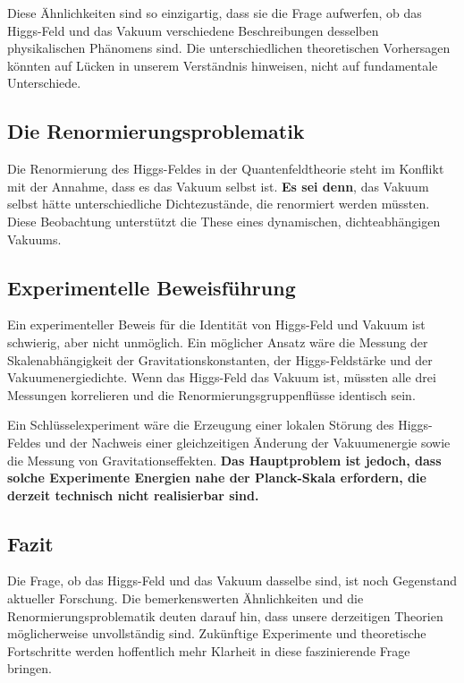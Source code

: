 \documentclass{article}
\begin{document}
	Diese Ähnlichkeiten sind so einzigartig, dass sie die Frage aufwerfen, ob das Higgs-Feld und das Vakuum verschiedene Beschreibungen desselben physikalischen Phänomens sind. Die unterschiedlichen theoretischen Vorhersagen könnten auf Lücken in unserem Verständnis hinweisen, nicht auf fundamentale Unterschiede.
	
	\subsection*{Die Renormierungsproblematik}
	
	Die Renormierung des Higgs-Feldes in der Quantenfeldtheorie steht im Konflikt mit der Annahme, dass es das Vakuum selbst ist. \textbf{Es sei denn}, das Vakuum selbst hätte unterschiedliche Dichtezustände, die renormiert werden müssten. Diese Beobachtung unterstützt die These eines dynamischen, dichteabhängigen Vakuums.
	
	\subsection*{Experimentelle Beweisführung}
	
	Ein experimenteller Beweis für die Identität von Higgs-Feld und Vakuum ist schwierig, aber nicht unmöglich. Ein möglicher Ansatz wäre die Messung der Skalenabhängigkeit der Gravitationskonstanten, der Higgs-Feldstärke und der Vakuumenergiedichte. Wenn das Higgs-Feld das Vakuum ist, müssten alle drei Messungen korrelieren und die Renormierungsgruppenflüsse identisch sein.
	
	Ein Schlüsselexperiment wäre die Erzeugung einer lokalen Störung des Higgs-Feldes und der Nachweis einer gleichzeitigen Änderung der Vakuumenergie sowie die Messung von Gravitationseffekten. \textbf{Das Hauptproblem ist jedoch, dass solche Experimente Energien nahe der Planck-Skala erfordern, die derzeit technisch nicht realisierbar sind.}
	
	\subsection*{Fazit}
	
	Die Frage, ob das Higgs-Feld und das Vakuum dasselbe sind, ist noch Gegenstand aktueller Forschung. Die bemerkenswerten Ähnlichkeiten und die Renormierungsproblematik deuten darauf hin, dass unsere derzeitigen Theorien möglicherweise unvollständig sind. Zukünftige Experimente und theoretische Fortschritte werden hoffentlich mehr Klarheit in diese faszinierende Frage bringen.
\end{document}
